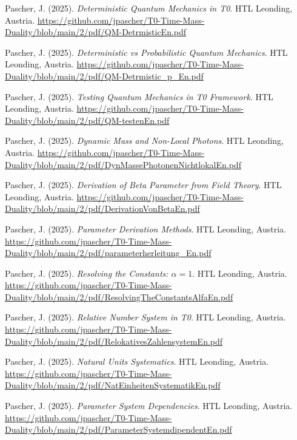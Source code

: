\documentclass{article}
\begin{document}
\begin{thebibliography}{99}
		Pascher, J. (2025).
		\textit{Deterministic Quantum Mechanics in T0}.
		HTL Leonding, Austria.
		\url{https://github.com/jpascher/T0-Time-Mass-Duality/blob/main/2/pdf/QM-DetrmisticEn.pdf}
		
		Pascher, J. (2025).
		\textit{Deterministic vs Probabilistic Quantum Mechanics}.
		HTL Leonding, Austria.
		\url{https://github.com/jpascher/T0-Time-Mass-Duality/blob/main/2/pdf/QM-Detrmistic_p_En.pdf}
		
		Pascher, J. (2025).
		\textit{Testing Quantum Mechanics in T0 Framework}.
		HTL Leonding, Austria.
		\url{https://github.com/jpascher/T0-Time-Mass-Duality/blob/main/2/pdf/QM-testenEn.pdf}
		
		Pascher, J. (2025).
		\textit{Dynamic Mass and Non-Local Photons}.
		HTL Leonding, Austria.
		\url{https://github.com/jpascher/T0-Time-Mass-Duality/blob/main/2/pdf/DynMassePhotonenNichtlokalEn.pdf}
		
		
		Pascher, J. (2025).
		\textit{Derivation of Beta Parameter from Field Theory}.
		HTL Leonding, Austria.
		\url{https://github.com/jpascher/T0-Time-Mass-Duality/blob/main/2/pdf/DerivationVonBetaEn.pdf}
		
		Pascher, J. (2025).
		\textit{Parameter Derivation Methods}.
		HTL Leonding, Austria.
		\url{https://github.com/jpascher/T0-Time-Mass-Duality/blob/main/2/pdf/parameterherleitung_En.pdf}
		
		Pascher, J. (2025).
		\textit{Resolving the Constants: $\alpha = 1$}.
		HTL Leonding, Austria.
		\url{https://github.com/jpascher/T0-Time-Mass-Duality/blob/main/2/pdf/ResolvingTheConstantsAlfaEn.pdf}
		
		Pascher, J. (2025).
		\textit{Relative Number System in T0}.
		HTL Leonding, Austria.
		\url{https://github.com/jpascher/T0-Time-Mass-Duality/blob/main/2/pdf/RelokativesZahlensystemEn.pdf}
		
		Pascher, J. (2025).
		\textit{Natural Units Systematics}.
		HTL Leonding, Austria.
		\url{https://github.com/jpascher/T0-Time-Mass-Duality/blob/main/2/pdf/NatEinheitenSystematikEn.pdf}
		
		Pascher, J. (2025).
		\textit{Parameter System Dependencies}.
		HTL Leonding, Austria.
		\url{https://github.com/jpascher/T0-Time-Mass-Duality/blob/main/2/pdf/ParameterSystemdipendentEn.pdf}
		

\end{thebibliography}
\end{document}

